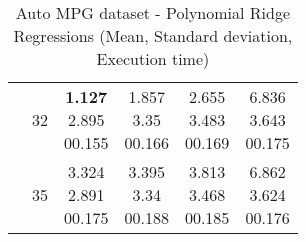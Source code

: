 \begin{table}[p]
\begin{center}
\begin{tabular}{|c|c|c|c|c|c|}
\cline{2-6} & 32 & \minibox{\textbf{1.127} \\ 2.895 \\ 00.155} & \minibox{1.857 \\ 3.35 \\ 00.166} & \minibox{2.655 \\ 3.483 \\ 00.169} & \minibox{6.836 \\ 3.643 \\ 00.175} \\

\cline{2-6} & 35 & \minibox{3.324 \\ 2.891 \\ 00.175} & \minibox{3.395 \\ 3.34 \\ 00.188} & \minibox{3.813 \\ 3.468 \\ 00.185} & \minibox{6.862 \\ 3.624 \\ 00.176} \\

\hline
\end{tabular}

    \caption{Auto MPG dataset - Polynomial Ridge Regressions (Mean, Standard deviation, Execution time)}
    \label{table:db1-polynomialregression}
\end{center}
    \end{table}

